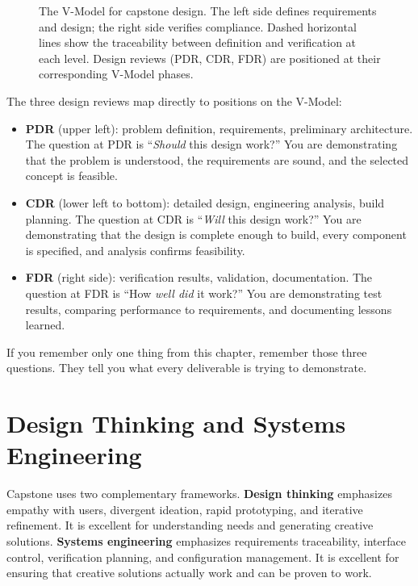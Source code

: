 \begin{figure}[htbp]
\caption{The V-Model for capstone design. The left side defines requirements and design; the right side verifies compliance. Dashed horizontal lines show the traceability between definition and verification at each level. Design reviews (PDR, CDR, FDR) are positioned at their corresponding V-Model phases.}\label{fig:v-model}
\end{figure}

The three design reviews map directly to positions on the V-Model:
\begin{itemize}[nosep,leftmargin=1.5em]
\item \textbf{PDR} (upper left): problem definition, requirements, preliminary architecture. The question at PDR is ``\emph{Should} this design work?'' You are demonstrating that the problem is understood, the requirements are sound, and the selected concept is feasible.
\item \textbf{CDR} (lower left to bottom): detailed design, engineering analysis, build planning. The question at CDR is ``\emph{Will} this design work?'' You are demonstrating that the design is complete enough to build, every component is specified, and analysis confirms feasibility.
\item \textbf{FDR} (right side): verification results, validation, documentation. The question at FDR is ``How \emph{well did} it work?'' You are demonstrating test results, comparing performance to requirements, and documenting lessons learned.
\end{itemize}

If you remember only one thing from this chapter, remember those three questions. They tell you what every deliverable is trying to demonstrate.


\section{Design Thinking and Systems Engineering}
Capstone uses two complementary frameworks. \textbf{Design thinking} emphasizes empathy with users, divergent ideation, rapid prototyping, and iterative refinement. It is excellent for understanding needs and generating creative solutions. \textbf{Systems engineering} emphasizes requirements traceability, interface control, verification planning, and configuration management. It is excellent for ensuring that creative solutions actually work and can be proven to work.

